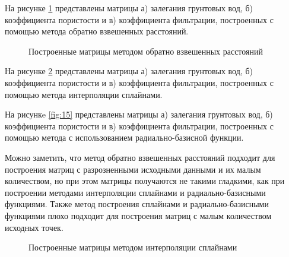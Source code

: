 На рисунке \ref{fig:13} представлены матрицы а) залегания грунтовых вод, б) коэффициента пористости и в) коэффициента фильтрации, построенных с помощью метода обратно взвешенных расстояний.

\begin{figure}[h]
    \begin{minipage}[h]{0.3\linewidth}
    \end{minipage}
    \hfill
    \begin{minipage}[h]{0.3\linewidth}
    \end{minipage}
    \hfill
    \begin{minipage}[h]{0.3\linewidth}
    \end{minipage}
\caption{Построенные матрицы методом обратно взвешенных расстояний}
\label{fig:13}
\end{figure}

На рисунке \ref{fig:14} представлены матрицы а) залегания грунтовых вод, б) коэффициента пористости и в) коэффициента фильтрации, построенных с помощью метода интерполяции сплайнами.

На рисункe \ref{fig:15} представлены матрицы а) залегания грунтовых вод, б) коэффициента пористости и в) коэффициента фильтрации, построенных с помощью метода с использованием радиально-базисной функции.

Можно заметить, что метод обратно взвешенных расстояний подходит для построения матриц с разрозненными исходными данными и их малым количеством, но при этом матрицы получаются не такими гладкими, как при построении методами интерполяции сплайнами и радиально-базисными функциями. Также метод построения сплайнами и радиально-базисными функциями плохо подходит для построения матриц с малым количеством исходных точек.

\begin{figure}[h]
    \begin{minipage}[h]{0.3\linewidth}
    \end{minipage}
    \hfill
    \begin{minipage}[h]{0.3\linewidth}
    \end{minipage}
    \hfill
    \begin{minipage}[h]{0.3\linewidth}
    \end{minipage}
\caption{Построенные матрицы методом интерполяции сплайнами}
\label{fig:14}
\end{figure}

